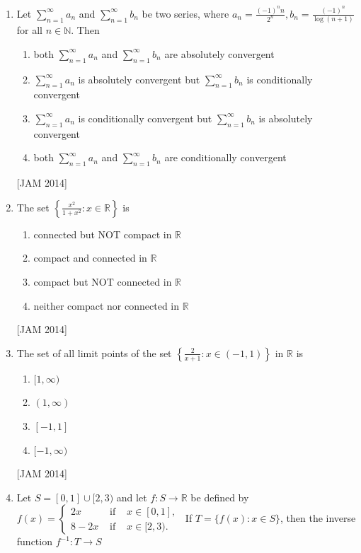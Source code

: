 \begin{enumerate}
 \item  Let $\sum_{n=1}^{\infty} a_{n}$ and $\sum_{n=1}^{\infty} b_{n}$ be two series, where $a_{n}=\frac{(-1)^{n} n}{2^{n}}, b_{n}=\frac{(-1)^{n}}{\log (n+1)}$ for all $n \in \mathbb{N}$. Then
 

\begin{enumerate}
 \item both $\sum_{n=1}^{\infty} a_{n}$ and $\sum_{n=1}^{\infty} b_{n}$ are absolutely convergent 
\item $\sum_{n=1}^{\infty} a_{n}$ is absolutely convergent but $\sum_{n=1}^{\infty} b_{n}$ is conditionally convergent 
\item $\sum_{n=1}^{\infty} a_{n}$ is conditionally convergent but $\sum_{n=1}^{\infty} b_{n}$ is absolutely convergent 
\item both $\sum_{n=1}^{\infty} a_{n}$ and $\sum_{n=1}^{\infty} b_{n}$ are conditionally convergent
\end{enumerate}
\hfill [JAM 2014]



\item  The set $\left\{\frac{x^{2}}{1+x^{2}}: x \in \mathbb{R}\right\}$ is

\begin{enumerate}
 \item connected but NOT compact in $\mathbb{R}$ 
\item compact and connected in $\mathbb{R}$ 
\item compact but NOT connected in $\mathbb{R}$ 
\item neither compact nor connected in $\mathbb{R}$
\end{enumerate}
\hfill [JAM 2014]
 


\item  The set of all limit points of the set $\left\{\frac{2}{x+1}: x \in(-1,1)\right\}$ in $\mathbb{R}$ is 

\begin{enumerate}
 
\item $[1, \infty)$ 
\item $(1, \infty)$ 
\item $[-1,1]$ 
\item $[-1, \infty)$
\end{enumerate}
\hfill [JAM 2014]


\item  Let $S=[0,1] \cup[2,3)$ and let $f: S \rightarrow \mathbb{R}$ be defined by $f(x)=\left\{\begin{array}{lll}2 x & \text { if } & x \in[0,1] \text {, } \\ 8-2 x & \text { if } & x \in[2,3) .\end{array}\right.$ If $T=\{f(x): x \in S\}$, then the inverse function $f^{-1}: T \rightarrow S$ 


\end{enumerate}

